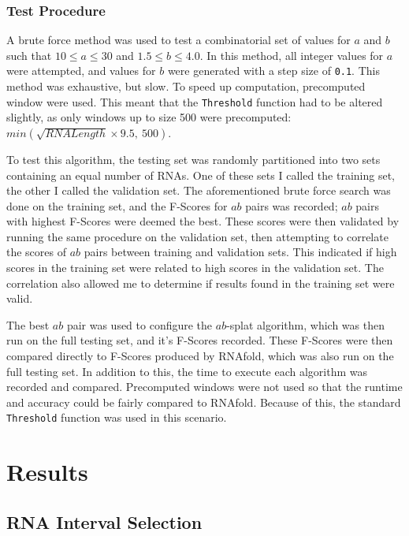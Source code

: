 \documentclass{cshonours}
\begin{document}
\subsection{Test Procedure}

A brute force method was used to test a combinatorial set of values for $a$ and $b$ such that $10 \leq a \leq 30$ and $1.5 \leq b \leq 4.0$. In this method, all integer values for $a$ were attempted, and values for $b$ were generated with a step size of \texttt{0.1}. This method was exhaustive, but slow. To speed up computation, precomputed window were used. This meant that the \texttt{Threshold} function had to be altered slightly, as only windows up to size 500 were precomputed:  $min(\sqrt{RNALength} \times 9.5, \: 500)$.

To test this algorithm, the testing set was randomly partitioned into two sets containing an equal number of RNAs. One of these sets I called the training set, the other I called the validation set. The aforementioned brute force search was done on the training set, and the F-Scores for $ab$ pairs was recorded; $ab$ pairs with highest F-Scores were deemed the best. These scores were then validated by running the same procedure on the validation set, then attempting to correlate the scores of $ab$ pairs between training and validation sets. This  indicated if high scores in the training set were related to high scores in the validation set. The correlation also allowed me to determine if results found in the training set were valid.

The best $ab$ pair was used to configure the $ab$-splat algorithm, which was then run on the full testing set, and it's F-Scores recorded. These F-Scores were then compared directly to F-Scores produced by RNAfold, which was also run on the full testing set. In addition to this, the time to execute each algorithm was recorded and compared. Precomputed windows were not used so that the runtime and accuracy could be fairly compared to RNAfold. Because of this, the standard \texttt{Threshold} function was used in this scenario.

\chapter{Results}

\section{RNA Interval Selection}
\end{document}
